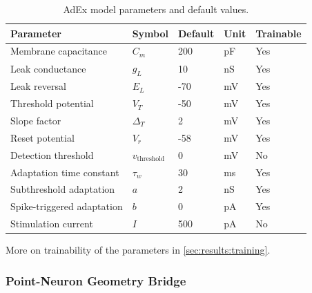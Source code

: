 \begin{table}[t]
\centering
\caption{\gls{AdEx} model parameters and default values.}
\label{tab:adex_params}
\begin{tabular}{lllll}
\toprule
\textbf{Parameter} & \textbf{Symbol} & \textbf{Default} & \textbf{Unit} & \textbf{Trainable} \\
\midrule
Membrane capacitance & $C_m$ & 200 & pF & Yes\\
Leak conductance & $g_L$ & 10 & nS & Yes\\
Leak reversal & $E_L$ & -70 & mV & Yes \\
Threshold potential & $V_T$ & -50 & mV & Yes\\
Slope factor & $\Delta_T$ & 2 & mV & Yes\\
Reset potential & $V_r$ & -58 & mV & Yes \\
Detection threshold & $v_{\text{threshold}}$ & 0 & mV & No \\
Adaptation time constant & $\tau_w$ & 30 & ms & Yes\footnotemark[2]\\
Subthreshold adaptation & $a$ & 2 & nS & Yes\footnotemark[2] \\
Spike-triggered adaptation & $b$ & 0 & pA & Yes\footnotemark[2] \\
Stimulation current & $I$ & 500 & pA & No \\
\bottomrule
\end{tabular}
\end{table}

More on trainability of the parameters in \cref{sec:results:training}.

\subsubsection*{Point-Neuron Geometry Bridge}\label{sec:method:adex:geometry-bridge}

